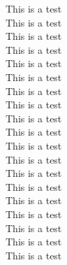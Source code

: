 \documentclass[]{instagram}
\begin{document}
\null\vfill
This is a test \\
This is a test \\
This is a test \\
This is a test \\
This is a test \\
This is a test \\
This is a test \\
This is a test \\
This is a test \\
This is a test \\
This is a test \\
This is a test \\
\vfill \newpage \null\vfill
This is a test \\
This is a test \\
This is a test \\
This is a test \\
This is a test \\
This is a test \\
This is a test \\
\vfill
\end{document}
